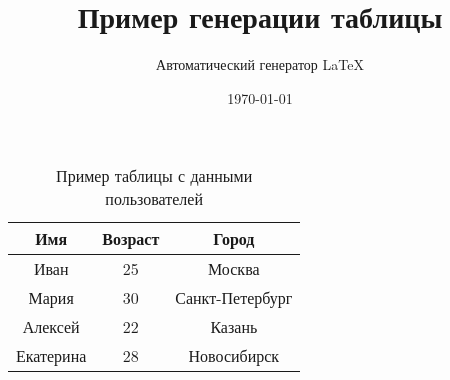 \documentclass{article}
\title{Пример генерации таблицы}
\author{Автоматический генератор LaTeX}
\date{\today}
\begin{document}
\maketitle

\begin{table}[h]
\centering
\begin{tabular}{|c|c|c|}
\hline
Имя & Возраст & Город \\
\hline
Иван & 25 & Москва \\
\hline
Мария & 30 & Санкт-Петербург \\
\hline
Алексей & 22 & Казань \\
\hline
Екатерина & 28 & Новосибирск \\
\hline
\end{tabular}
\caption{Пример таблицы с данными пользователей}
\label{tab:users}
\end{table}
\end{document}
